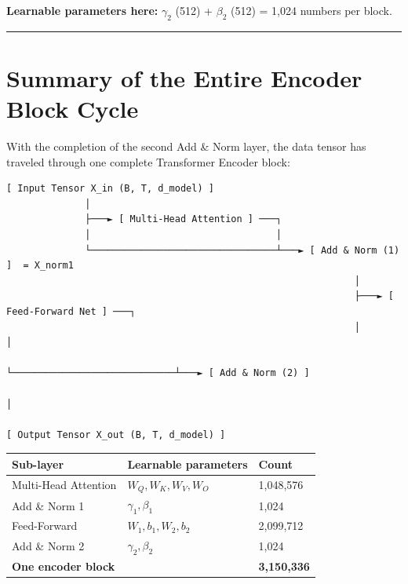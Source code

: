 \documentclass[11pt,a4paper,oneside]{report}
\begin{document}
\textbf{Learnable parameters here:} \(\gamma_2\) (512) + \(\beta_2\) (512) = 1,024 numbers per block.

\begin{center}\rule{0.5\linewidth}{0.5pt}\end{center}

\section{Summary of the Entire Encoder Block Cycle}\label{summary-of-the-entire-encoder-block-cycle}

With the completion of the second Add \& Norm layer, the data tensor has traveled through one complete Transformer Encoder block:

\begin{Verbatim}[fontsize=\tiny]
[ Input Tensor X_in (B, T, d_model) ]
              │
              ├───► [ Multi-Head Attention ] ───┐
              │                                 │
              └─────────────────────────────────┴───► [ Add & Norm (1) ]  = X_norm1
                                                              │
                                                              ├───► [ Feed-Forward Net ] ───┐
                                                              │                             │
                                                              └─────────────────────────────┴───► [ Add & Norm (2) ]
                                                                                                        │
                                                                                         [ Output Tensor X_out (B, T, d_model) ]
\end{Verbatim}

{\def\LTcaptype{none} %
\begin{longtable}[]{@{}lll@{}}
\toprule\noalign{}
Sub-layer & Learnable parameters & Count \\
\midrule\noalign{}
\endhead
\bottomrule\noalign{}
\endlastfoot
Multi-Head Attention & \(W_Q,\allowbreak W_K,\allowbreak W_V,\allowbreak W_O\) & 1,048,576 \\
Add \& Norm 1 & \(\gamma_1,\allowbreak \beta_1\) & 1,024 \\
Feed-Forward & \(W_1,\allowbreak b_1,\allowbreak W_2,\allowbreak b_2\) & 2,099,712 \\
Add \& Norm 2 & \(\gamma_2,\allowbreak \beta_2\) & 1,024 \\
\textbf{One encoder block} & & \textbf{3,150,336} \\
\end{longtable}
}
\end{document}
